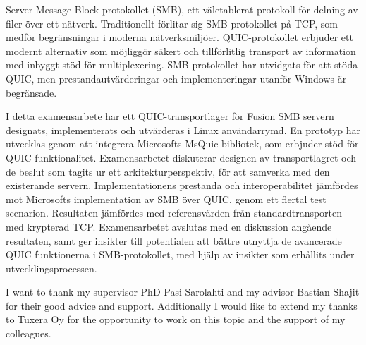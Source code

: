 \documentclass[english, 12pt, a4paper, elec, utf8, a-2b, online]{aaltothesis}
\begin{document}
\newpage

\begin{abstractpage}[swedish]
	Server Message Block-protokollet (SMB), ett väletablerat protokoll för
	delning av filer över ett nätverk. Traditionellt förlitar sig SMB-protokollet
	på TCP, som medför begränsningar i moderna nätverksmiljöer. QUIC-protokollet
	erbjuder ett modernt alternativ som möjliggör säkert och tillförlitlig
	transport av information med inbyggt stöd för multiplexering. SMB-protokollet
	har utvidgats för att stöda QUIC, men prestandautvärderingar och implementeringar
	utanför Windows är begränsade.

	I detta examensarbete har ett QUIC-transportlager för Fusion SMB servern designats,
	implementerats och utvärderas i Linux användarrymd. En prototyp har utvecklas genom
	att integrera Microsofts MsQuic bibliotek, som erbjuder stöd för QUIC funktionalitet.
	Examensarbetet diskuterar designen av transportlagret och de beslut som tagits
	ur ett arkitekturperspektiv, för att samverka med den existerande servern. Implementationens
	prestanda och interoperabilitet jämfördes mot Microsofts implementation av SMB över QUIC,
	genom ett flertal test scenarion. Resultaten jämfördes med referensvärden från
	standardtransporten med krypterad TCP. Examensarbetet avslutas med en diskussion
	angående resultaten, samt ger insikter till potentialen att bättre utnyttja de avancerade
	QUIC funktionerna i SMB-protokollet, med hjälp av insikter som erhållits under
	utvecklingsprocessen.
\end{abstractpage}


\dothesispagenumbering{}


I want to thank my supervisor PhD Pasi Sarolahti and my advisor Bastian Shajit
for their good advice and support. Additionally I would like to extend my thanks
to Tuxera Oy for the opportunity to work on this topic and the support of my
colleagues.\\
\end{document}
